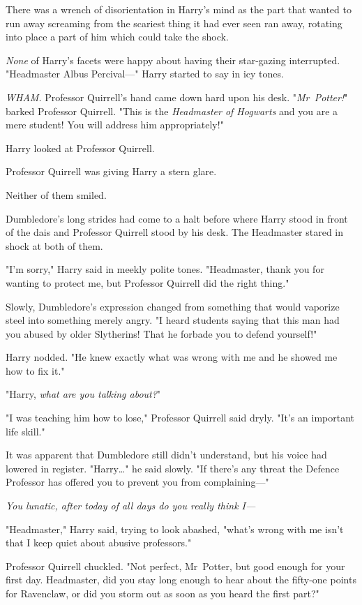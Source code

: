 There was a wrench of disorientation in Harry's mind as the part that wanted to
run away screaming from the scariest thing it had ever seen ran away, rotating
into place a part of him which could take the shock.

\emph{None} of Harry's facets were happy about having their star-gazing
interrupted. "Headmaster Albus Percival—" Harry started to say in icy tones.

\emph{WHAM.} Professor Quirrell's hand came down hard upon his desk.
"\emph{Mr~Potter!}" barked Professor Quirrell. "This is the \emph{Headmaster
of Hogwarts} and you are a mere student! You will address him appropriately!"

Harry looked at Professor Quirrell.

Professor Quirrell was giving Harry a stern glare.

Neither of them smiled.

Dumbledore's long strides had come to a halt before where Harry stood in front
of the dais and Professor Quirrell stood by his desk. The Headmaster stared in
shock at both of them.

"I'm sorry," Harry said in meekly polite tones. "Headmaster, thank you for
wanting to protect me, but Professor Quirrell did the right thing."

Slowly, Dumbledore's expression changed from something that would vaporize
steel into something merely angry. "I heard students saying that this man had
you abused by older Slytherins! That he forbade you to defend yourself!"

Harry nodded. "He knew exactly what was wrong with me and he showed me how to
fix it."

"Harry, \emph{what are you talking about?}"

"I was teaching him how to lose," Professor Quirrell said dryly. "It's an
important life skill."

It was apparent that Dumbledore still didn't understand, but his voice had
lowered in register. "Harry…" he said slowly. "If there's any threat the
Defence Professor has offered you to prevent you from complaining—"

\emph{You lunatic, after today of all days do you really think I—}

"Headmaster," Harry said, trying to look abashed, "what's wrong with me isn't
that I keep quiet about abusive professors."

Professor Quirrell chuckled. "Not perfect, Mr~Potter, but good enough for your
first day. Headmaster, did you stay long enough to hear about the fifty-one
points for Ravenclaw, or did you storm out as soon as you heard the first part?"

